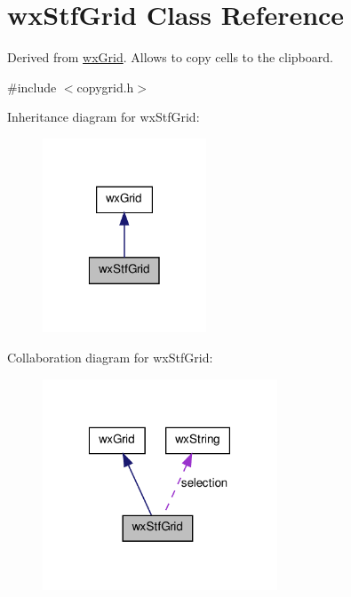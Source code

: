 \hypertarget{classwxStfGrid}{
\section{wxStfGrid Class Reference}
\label{classwxStfGrid}
}


Derived from \hyperlink{classwxGrid}{wxGrid}. Allows to copy cells to the clipboard.  




{\ttfamily \#include $<$copygrid.h$>$}



Inheritance diagram for wxStfGrid:
\nopagebreak
\begin{figure}[H]
\begin{center}
\leavevmode
\includegraphics[width=138pt]{classwxStfGrid__inherit__graph}
\end{center}
\end{figure}


Collaboration diagram for wxStfGrid:
\nopagebreak
\begin{figure}[H]
\begin{center}
\leavevmode
\includegraphics[width=198pt]{classwxStfGrid__coll__graph}
\end{center}
\end{figure}
